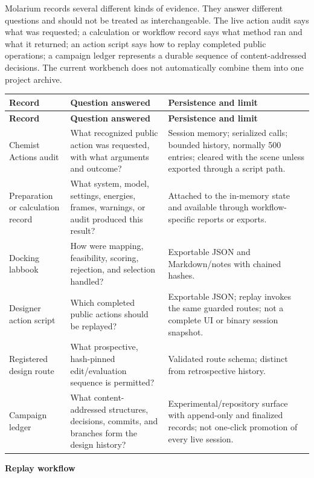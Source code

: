 \documentclass[10pt,letterpaper]{article}
\newcommand{\subhead}[1]{%
  \par\needspace{2\baselineskip}\vspace{2.5pt}%
  {\fontsize{10.91}{13.1}\selectfont\bfseries #1}\par\vspace{-1.5pt}}
\begin{document}
Molarium records several different kinds of evidence. They answer different questions and should not be treated as interchangeable. The live action audit says what was requested; a calculation or workflow record says what method ran and what it returned; an action script says how to replay completed public operations; a campaign ledger represents a durable sequence of content-addressed decisions. The current workbench does not automatically combine them into one project archive.

\begingroup
\fontsize{8.0}{9.5}\selectfont
\begin{longtable}{@{}p{1.23in}p{2.76in}p{2.61in}@{}}
\toprule
\textbf{Record} & \textbf{Question answered} & \textbf{Persistence and limit}\\
\midrule
\endfirsthead
\toprule
\textbf{Record} & \textbf{Question answered} & \textbf{Persistence and limit}\\
\midrule
\endhead
Chemist Actions audit & What recognized public action was requested, with what arguments and outcome? & Session memory; serialized calls; bounded history, normally 500 entries; cleared with the scene unless exported through a script path.\\
Preparation or calculation record & What system, model, settings, energies, frames, warnings, or audit produced this result? & Attached to the in-memory state and available through workflow-specific reports or exports.\\
Docking labbook & How were mapping, feasibility, scoring, rejection, and selection handled? & Exportable JSON and Markdown/notes with chained hashes.\\
Designer action script & Which completed public actions should be replayed? & Exportable JSON; replay invokes the same guarded routes; not a complete UI or binary session snapshot.\\
Registered design route & What prospective, hash-pinned edit/evaluation sequence is permitted? & Validated route schema; distinct from retrospective history.\\
Campaign ledger & What content-addressed structures, decisions, commits, and branches form the design history? & Experimental/repository surface with append-only and finalized records; not one-click promotion of every live session.\\
\bottomrule
\end{longtable}
\endgroup

\subhead{Replay workflow}
\end{document}
